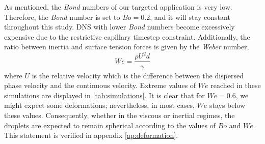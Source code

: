 As mentioned, the \textit{Bond} numbers of our targeted application is very low.
Therefore, the \textit{Bond} number is set to $Bo = 0.2$, and it will stay constant throughout this study.
DNS with lower \textit{Bond} numbers become excessively expensive due to the restrictive capillary timestep constraint. 
Additionally, the ratio between inertia and surface tension forces is given by the \textit{Weber} number, 
\begin{equation*}
    We = \frac{\rho U^2d}{\gamma}%
\end{equation*}
where $U$ is the relative velocity which is the difference between the dispersed phase velocity and the continuous velocity. %
Extreme values of $We$ reached in these simulations are displayed in \ref{tab:simulations}. 
It is clear that for $We=0.6$, we might expect some deformations; nevertheless, in most cases, $We$ stays below these values. 
Consequently, whether in the viscous or inertial regimes, the droplets are expected to remain spherical according to the values of $Bo$ and $We$.
This statement is verified in appendix \ref{ap:deformation}. 


